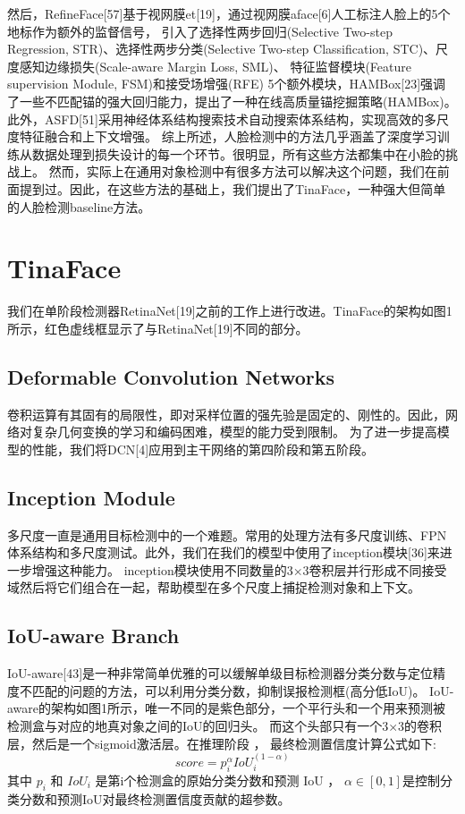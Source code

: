 \documentclass[twocolumn,10pt,a4paper]{article}%
\begin{document}
	然后，RefineFace[57]基于视网膜et[19]，通过视网膜aface[6]人工标注人脸上的5个地标作为额外的监督信号，
	引入了选择性两步回归(Selective Two-step Regression, STR)、选择性两步分类(Selective Two-step Classification, STC)、尺度感知边缘损失(Scale-aware Margin Loss, SML)、
	特征监督模块(Feature supervision Module, FSM)和接受场增强(RFE) 5个额外模块，HAMBox[23]强调了一些不匹配锚的强大回归能力，提出了一种在线高质量锚挖掘策略(HAMBox)。
	此外，ASFD[51]采用神经体系结构搜索技术自动搜索体系结构，实现高效的多尺度特征融合和上下文增强。
	综上所述，人脸检测中的方法几乎涵盖了深度学习训练从数据处理到损失设计的每一个环节。很明显，所有这些方法都集中在小脸的挑战上。
	然而，实际上在通用对象检测中有很多方法可以解决这个问题，我们在前面提到过。因此，在这些方法的基础上，我们提出了TinaFace，一种强大但简单的人脸检测baseline方法。

	
	
	\section{TinaFace}
	
	我们在单阶段检测器RetinaNet[19]之前的工作上进行改进。TinaFace的架构如图1所示，红色虚线框显示了与RetinaNet[19]不同的部分。

	\subsection{Deformable Convolution Networks}
	卷积运算有其固有的局限性，即对采样位置的强先验是固定的、刚性的。因此，网络对复杂几何变换的学习和编码困难，模型的能力受到限制。
	为了进一步提高模型的性能，我们将DCN[4]应用到主干网络的第四阶段和第五阶段。
	
	\subsection{Inception Module}
	多尺度一直是通用目标检测中的一个难题。常用的处理方法有多尺度训练、FPN体系结构和多尺度测试。此外，我们在我们的模型中使用了inception模块[36]来进一步增强这种能力。
	inception模块使用不同数量的3×3卷积层并行形成不同接受域然后将它们组合在一起，帮助模型在多个尺度上捕捉检测对象和上下文。
	
	\subsection{IoU-aware Branch}
	IoU-aware[43]是一种非常简单优雅的可以缓解单级目标检测器分类分数与定位精度不匹配的问题的方法，可以利用分类分数，抑制误报检测框(高分低IoU)。
	IoU-aware的架构如图1所示，唯一不同的是紫色部分，一个平行头和一个用来预测被检测盒与对应的地真对象之间的IoU的回归头。
	而这个头部只有一个3×3的卷积层，然后是一个sigmoid激活层。在推理阶段 ， 最终检测置信度计算公式如下:
	\begin{equation}%
		score=p_{i}^{\alpha}IoU_{i}^{(1-\alpha)}
	\end{equation}
	其中 $p_i$ 和 $IoU_i$ 是第i个检测盒的原始分类分数和预测 IoU ， $\alpha \in [0,1]$是控制分类分数和预测IoU对最终检测置信度贡献的超参数。
	
\end{document}
